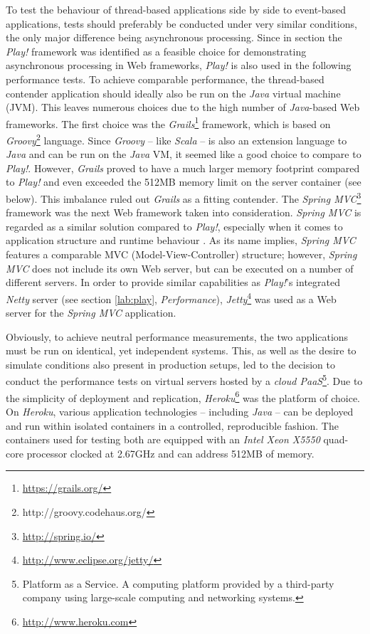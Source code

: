To test the behaviour of thread-based applications side by side to event-based applications, tests should preferably be conducted under very similar conditions, the only major difference being asynchronous processing. Since in section \label{lab:lang} the \textit{Play!} framework was identified  as a feasible choice for demonstrating asynchronous processing in Web frameworks, \textit{Play!} is also used in the following performance tests. To achieve comparable performance, the thread-based contender application should ideally also be run on the \textit{Java} virtual machine (JVM). This leaves numerous choices due to the high number of \textit{Java}-based Web frameworks. The first choice was the \textit{Grails}\footnote{\url{https://grails.org/}} framework, which is based on \textit{Groovy}\footnote{http://groovy.codehaus.org/} language. Since \textit{Groovy} -- like \textit{Scala} -- is also an extension language to \textit{Java} and can be run on the \textit{Java} VM, it seemed like a good choice to compare to \textit{Play!}. However, \textit{Grails} proved to have a much larger memory footprint compared to \textit{Play!} and even exceeded the 512MB memory limit on the server container (see below). This imbalance ruled out \textit{Grails} as a fitting contender. The \textit{Spring MVC}\footnote{\url{http://spring.io/}} framework was the next Web framework taken into consideration. \textit{Spring MVC} is regarded as a similar solution compared to \textit{Play!}, especially when it comes to application structure and runtime behaviour \cite[p. 109]{Scala}. As its name implies, \textit{Spring MVC} features a comparable MVC (Model-View-Controller) structure; however, \textit{Spring MVC} does not include its own Web server, but can be executed on a number of different servers. In order to provide similar capabilities as \textit{Play!}'s integrated \textit{Netty} server (see section \ref{lab:play}, \textit{Performance}), \textit{Jetty}\footnote{\url{http://www.eclipse.org/jetty/}} was used as a Web server for the \textit{Spring MVC} application.

Obviously, to achieve neutral performance measurements, the two applications must be run on identical, yet independent systems. This, as well as the desire to simulate conditions also present in production setups, led to the decision to conduct the performance tests on virtual servers hosted by a \textit{cloud PaaS}\footnote{Platform as a Service. A computing platform provided by a third-party company using large-scale computing and networking systems.}. Due to the simplicity of deployment and replication, \textit{Heroku}\footnote{\url{http://www.heroku.com}} was the platform of choice. On \textit{Heroku}, various application technologies -- including \textit{Java} -- can be deployed and run within isolated containers in a controlled, reproducible fashion. The containers used for testing both are equipped with an \textit{Intel Xeon X5550} quad-core processor clocked at 2.67GHz and can address 512MB of memory.

